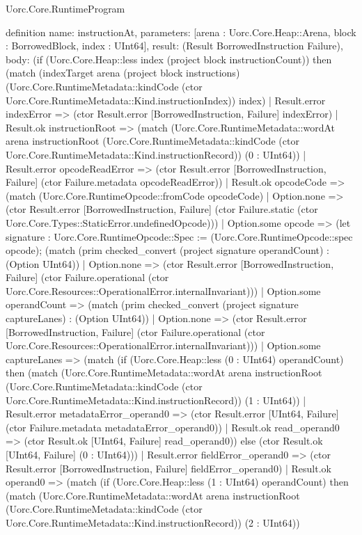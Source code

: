 \begin{lexlean}{Uorc.Core.RuntimeProgram}
\begin{semanticmodule}
definition{
  name: instructionAt,
  parameters: [arena : Uorc.Core.Heap::Arena, block : BorrowedBlock, index : UInt64],
  result: (Result BorrowedInstruction Failure),
  body: (if (Uorc.Core.Heap::less index (project block instructionCount)) then (match (indexTarget arena (project block instructions) (Uorc.Core.RuntimeMetadata::kindCode (ctor Uorc.Core.RuntimeMetadata::Kind.instructionIndex)) index)
    | Result.error indexError => (ctor Result.error [BorrowedInstruction, Failure] indexError)
    | Result.ok instructionRoot => (match (Uorc.Core.RuntimeMetadata::wordAt arena instructionRoot (Uorc.Core.RuntimeMetadata::kindCode (ctor Uorc.Core.RuntimeMetadata::Kind.instructionRecord)) (0 : UInt64))
      | Result.error opcodeReadError => (ctor Result.error [BorrowedInstruction, Failure] (ctor Failure.metadata opcodeReadError))
      | Result.ok opcodeCode => (match (Uorc.Core.RuntimeOpcode::fromCode opcodeCode)
        | Option.none => (ctor Result.error [BorrowedInstruction, Failure] (ctor Failure.static (ctor Uorc.Core.Types::StaticError.undefinedOpcode)))
        | Option.some opcode => (let signature : Uorc.Core.RuntimeOpcode::Spec := (Uorc.Core.RuntimeOpcode::spec opcode); (match (prim checked_convert (project signature operandCount) : (Option UInt64))
          | Option.none => (ctor Result.error [BorrowedInstruction, Failure] (ctor Failure.operational (ctor Uorc.Core.Resources::OperationalError.internalInvariant)))
          | Option.some operandCount => (match (prim checked_convert (project signature captureLanes) : (Option UInt64))
            | Option.none => (ctor Result.error [BorrowedInstruction, Failure] (ctor Failure.operational (ctor Uorc.Core.Resources::OperationalError.internalInvariant)))
            | Option.some captureLanes => (match (if (Uorc.Core.Heap::less (0 : UInt64) operandCount) then (match (Uorc.Core.RuntimeMetadata::wordAt arena instructionRoot (Uorc.Core.RuntimeMetadata::kindCode (ctor Uorc.Core.RuntimeMetadata::Kind.instructionRecord)) (1 : UInt64))
                | Result.error metadataError_operand0 => (ctor Result.error [UInt64, Failure] (ctor Failure.metadata metadataError_operand0))
                | Result.ok read_operand0 => (ctor Result.ok [UInt64, Failure] read_operand0)) else (ctor Result.ok [UInt64, Failure] (0 : UInt64)))
              | Result.error fieldError_operand0 => (ctor Result.error [BorrowedInstruction, Failure] fieldError_operand0)
              | Result.ok operand0 => (match (if (Uorc.Core.Heap::less (1 : UInt64) operandCount) then (match (Uorc.Core.RuntimeMetadata::wordAt arena instructionRoot (Uorc.Core.RuntimeMetadata::kindCode (ctor Uorc.Core.RuntimeMetadata::Kind.instructionRecord)) (2 : UInt64))
}
\end{semanticmodule}
\end{lexlean}
